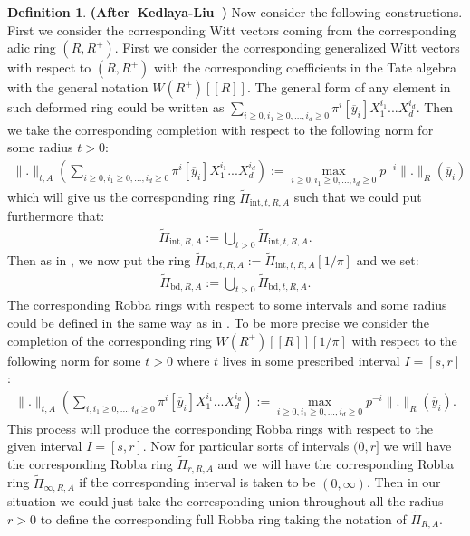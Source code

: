 \documentclass[12pt]{amsart}
\theoremstyle{definition}
\newtheorem{definition}[theorem]{Definition}
\numberwithin{equation}{section}
\begin{document}

\begin{definition}\mbox{\bf{(After Kedlaya-Liu \cite[Definition 4.1.1]{KL2})}} Now consider the following constructions. First we consider the corresponding Witt vectors coming from the corresponding adic ring $(R,R^+)$. First we consider the corresponding generalized Witt vectors with respect to $(R,R^+)$ with the corresponding coefficients in the Tate algebra with the general notation $W(R^+)[[R]]$. The general form of any element in such deformed ring could be written as $\sum_{i\geq 0,i_1\geq 0,...,i_d\geq 0}\pi^i[\overline{y}_i]X_1^{i_1}...X_d^{i_d}$. Then we take the corresponding completion with respect to the following norm for some radius $t>0$:
\begin{align}
\|.\|_{t,A}(\sum_{i\geq 0,i_1\geq 0,...,i_d\geq 0}\pi^i[\overline{y}_i]X_1^{i_1}...X_d^{i_d}):= \max_{i\geq 0,i_1\geq 0,...,i_d\geq 0}p^{-i}\|.\|_R(\overline{y}_i)	
\end{align}
which will give us the corresponding ring $\widetilde{\Pi}_{\mathrm{int},t,R,A}$ such that we could put furthermore that:
\begin{align}
\widetilde{\Pi}_{\mathrm{int},R,A}:=\bigcup_{t>0} \widetilde{\Pi}_{\mathrm{int},t,R,A}.	
\end{align}
Then as in \cite[Definition 4.1.1]{KL2}, we now put the ring $\widetilde{\Pi}_{\mathrm{bd},t,R,A}:=\widetilde{\Pi}_{\mathrm{int},t,R,A}[1/\pi]$ and we set:
\begin{align}
\widetilde{\Pi}_{\mathrm{bd},R,A}:=\bigcup_{t>0} \widetilde{\Pi}_{\mathrm{bd},t,R,A}.	
\end{align}
The corresponding Robba rings with respect to some intervals and some radius could be defined in the same way as in \cite[Definition 4.1.1]{KL2}. To be more precise we consider the completion of the corresponding ring $W(R^+)[[R]][1/\pi]$ with respect to the following norm for some $t>0$ where $t$ lives in some prescribed interval $I=[s,r]$: 
\begin{align}
\|.\|_{t,A}(\sum_{i,i_1\geq 0,...,i_d\geq 0}\pi^i[\overline{y}_i]X_1^{i_1}...X_d^{i_d}):= \max_{i\geq 0,i_1\geq 0,...,i_d\geq 0}p^{-i}\|.\|_R(\overline{y}_i).	
\end{align}
This process will produce the corresponding Robba rings with respect to  the given interval $I=[s,r]$. Now for particular sorts of intervals $(0,r]$ we will have the corresponding Robba ring $\widetilde{\Pi}_{r,R,A}$ and we will have the corresponding Robba ring $\widetilde{\Pi}_{\infty,R,A}$	if the corresponding interval is taken to be $(0,\infty)$. Then in our situation we could just take the corresponding union throughout all the radius $r>0$ to define the corresponding full Robba ring taking the notation of $\widetilde{\Pi}_{R,A}$.
\end{definition}
\end{document}
